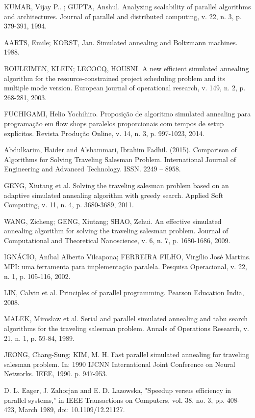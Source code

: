 \documentclass[journal]{IEEEtran}
\begin{document}
\begin{thebibliography}{1}

 KUMAR, Vijay P.. ; GUPTA, Anshul. Analyzing scalability of parallel algorithms and architectures. Journal of parallel and distributed computing, v. 22, n. 3, p. 379-391, 1994.

AARTS, Emile; KORST, Jan. Simulated annealing and Boltzmann machines. 1988.
  
  BOULEIMEN, KLEIN; LECOCQ, HOUSNI. A new efficient simulated annealing algorithm for the resource-constrained project scheduling problem and its multiple mode version. European journal of operational research, v. 149, n. 2, p. 268-281, 2003.
 
  FUCHIGAMI, Helio Yochihiro. Proposição de algoritmo simulated annealing para programação em flow shops paralelos proporcionais com tempos de setup explícitos. Revista Produção Online, v. 14, n. 3, p. 997-1023, 2014.
 
 Abdulkarim, Haider and Alshammari, Ibrahim Fadhil. (2015). Comparison of Algorithms for Solving Traveling Salesman Problem. International Journal of Engineering and Advanced Technology. ISSN. 2249 – 8958. 
 
  GENG, Xiutang et al. Solving the traveling salesman problem based on an adaptive simulated annealing algorithm with greedy search. Applied Soft Computing, v. 11, n. 4, p. 3680-3689, 2011.
 
  WANG, Zicheng; GENG, Xiutang; SHAO, Zehui. An effective simulated annealing algorithm for solving the traveling salesman problem. Journal of Computational and Theoretical Nanoscience, v. 6, n. 7, p. 1680-1686, 2009.
 
  IGNÁCIO, Aníbal Alberto Vilcapona; FERREIRA FILHO, Virgílio José Martins. MPI: uma ferramenta para implementação paralela. Pesquisa Operacional, v. 22, n. 1, p. 105-116, 2002.
 
  LIN, Calvin et al. Principles of parallel programming. Pearson Education India, 2008.
 
  MALEK, Miroslaw et al. Serial and parallel simulated annealing and tabu search algorithms for the traveling salesman problem. Annals of Operations Research, v. 21, n. 1, p. 59-84, 1989.
 
  JEONG, Chang-Sung; KIM, M. H. Fast parallel simulated annealing for traveling salesman problem. In: 1990 IJCNN International Joint Conference on Neural Networks. IEEE, 1990. p. 947-953.
 
D. L. Eager, J. Zahorjan and E. D. Lazowska, "Speedup versus efficiency in parallel systems," in IEEE Transactions on Computers, vol. 38, no. 3, pp. 408-423, March 1989, doi: 10.1109/12.21127.


\end{thebibliography}
\end{document}
